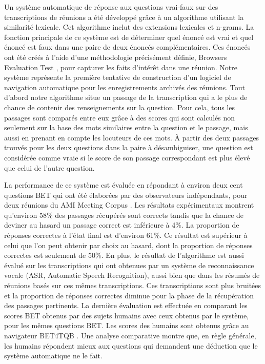 Un syst\`eme automatique de r\'eponse aux questions vrai-faux sur des transcriptions de r\'eunions a \'et\'e d\'evelopp\'e gr\^ace \`a un algorithme utilisant la similarit\'e lexicale. Cet algorithme inclut des extensions lexicales et n-grams. La fonction principale de ce syst\`eme est de d\'eterminer quel \'enonc\'e est vrai et quel \'enonc\'e est faux dans une paire de deux \'enonc\'es compl\'ementaires. Ces \'enonc\'es ont \'et\'e cr\'e\'es \`a l'aide d'une m\'ethodologie pr\'ecis\'ement d\'efinie, Browsers Evaluation Test \cite{BET}, pour capturer les faits d'int\'er\^et dans une r\'eunion. Notre syst\`eme repr\'esente la premi\`ere tentative de construction d'un logiciel de navigation automatique pour les enregistrements archiv\'es des r\'eunions.
Tout d'abord notre algorithme situe un passage de la transcription qui a le plus de chance de contenir des renseignements sur la question. Pour cela, tous les passages sont compar\'es entre eux gr\^ace \`a des scores qui sont calcul\'es non seulement sur la base des mots similaires entre la question et le passage, mais aussi en prenant en compte les locuteurs de ces mots. \`A partir des deux passages trouv\'es pour les deux questions dans la paire \`a d\'esambiguiser, une question est consid\'er\'ee comme vraie si le score de son passage correspondant est plus \'elev\'e que celui de l'autre question.

La performance de ce syst\`eme est \'evalu\'ee en r\'epondant \`a environ deux cent questions BET qui ont \'et\'e \'elabor\'ees par des observateurs ind\'ependants, pour deux r\'eunions du AMI Meeting Corpus \cite{AMI_corpus}. Les r\'esultats exp\'erimentaux montrent qu'environ 58\% des passages r\'ecup\'er\'es sont corrects tandis que la chance de deviner au hasard un passage correct est inf\'erieure \`a 4\%. La proportion de r\'eponses correctes \`a l'\'etat final est d'environ 61\%. Ce r\'esultat est sup\'erieur \`a celui que l'on peut obtenir par choix au hasard, dont la proportion de r\'eponses correctes est seulement de 50\%. En plus, le r\'esultat de l'algorithme est aussi \'evalu\'e sur les transcriptions qui ont obtenues par un syst\`eme de reconnaissance vocale (ASR, Automatic Speech Recognition), aussi bien que dans les r\'esum\'es de r\'eunions bas\'es sur ces m\^emes transcriptions. Ces transcriptions sont plus bruit\'ees et la proportion de r\'eponses correctes diminue pour la phase de la r\'ecup\'eration des passages pertinents. La derni\`ere \'evaluation est effectu\'ee en comparant les scores BET obtenus par des sujets humains avec ceux obtenus par le syst\`eme, pour les m\^emes questions BET. Les scores des humains sont obtenus gr\^ace au navigateur BET4TQB \cite{popescubelis2007otm}. Une analyse comparative montre que, en r\`egle g\'en\'erale, les humains r\'epondent mieux aux questions qui demandent une d\'eduction que le syst\`eme automatique ne le fait.

